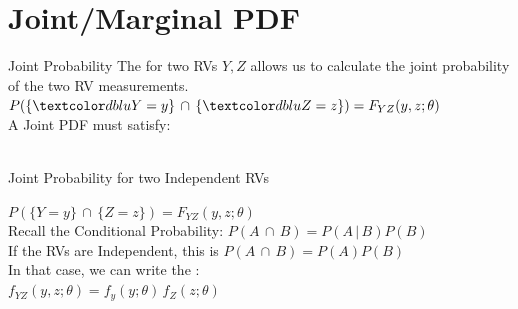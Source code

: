 \documentclass[10pt,sans,english,compress,table,xcolor=dvipsnames]{beamer}
\begin{document}
\section*{Joint/Marginal PDF}

\begin{frame}{Joint Probability}
The  for two RVs ${Y,Z}$ allows us to calculate the joint probability of the two RV measurements.\\[1ex]
 
 $P(\{\blu{Y =y}\}\,\cap\,\{\blu{Z=z}\}) = F_{YZ}(y,z;\theta)$\\[1ex]
 
A Joint PDF must satisfy:\\
\\[1ex]
\end{frame}



\begin{frame}{Joint Probability for two Independent RVs}

$P(\{Y =y\}\,\cap\,\{Z=z\}) = F_{YZ}(y,z;\theta)$\\[1ex]

Recall the  Conditional Probability: $P(A\, \cap\, B) = P(A\, |\, B) P(B) $\\[1ex]

If the RVs are Independent, this is $P(A\, \cap\, B) = P(A ) P(B) $\\[1ex]

In that case, we can write the :\\[1ex] 

 $ f_{YZ}(y,z;\theta) = f_{y}(y;\theta) \, f_Z (z;\theta) $\\[1ex]
 
 \\[1ex]

\end{frame}
\end{document}
